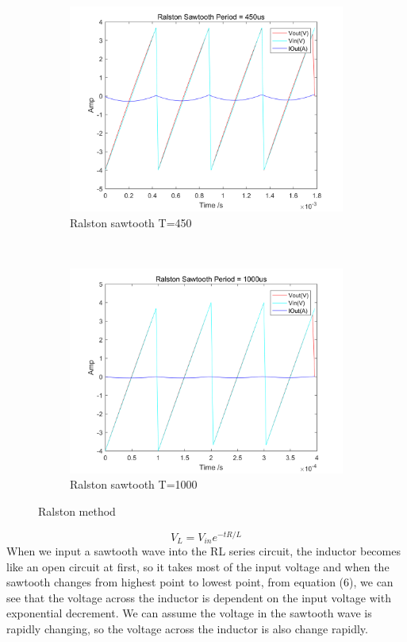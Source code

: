 \documentclass[a4paper, 12pt]{article}
\begin{document}
\begin{figure}[h]
\begin{subfigure}[b]{0.4\textwidth}
            \includegraphics[width=\textwidth]{ex1/ralston_sawtooth_450.png}
            \caption{Ralston sawtooth T=450}
      \end{subfigure}
       ~
      \begin{subfigure}[b]{0.4\textwidth}
            \includegraphics[width=\textwidth]{ex1/ralston_sawtooth_1000.png}
            \caption{Ralston sawtooth T=1000}
      \end{subfigure}
      \caption{Ralston method}
\end{figure}
\begin{equation}\label{inductor2}
V_{L} = V_{in}e^{-tR/L}
\end{equation} 
When we input a sawtooth wave into the RL series circuit, the inductor becomes like an open circuit at first, so it takes most of the input voltage and when the sawtooth changes from highest point to lowest point, from equation (6), we can see that the voltage across the inductor is dependent on the input voltage with exponential decrement. We can assume the voltage in the sawtooth wave is rapidly changing, so the voltage across the inductor is also change rapidly.   \par
\end{document}
